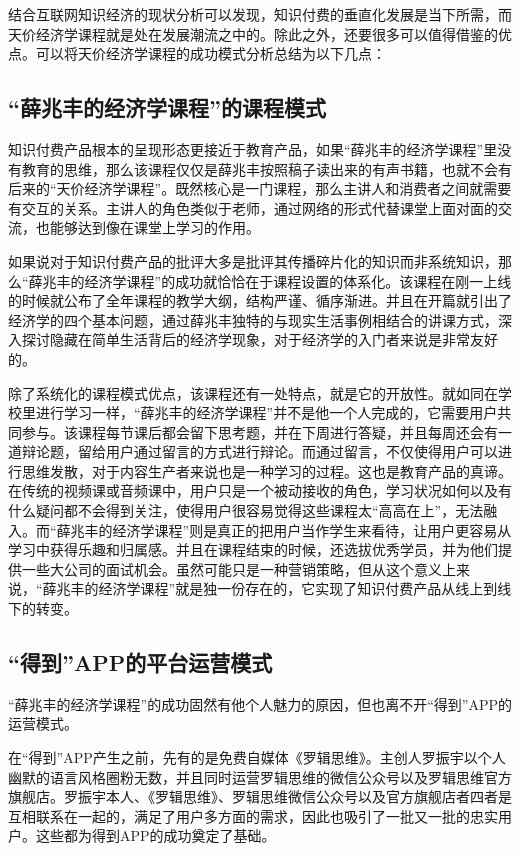 \documentclass[UTF8,a4paper,12pt]{ctexart}  %
\begin{document}
结合互联网知识经济的现状分析可以发现，知识付费的垂直化发展是当下所需，而天价经济学课程就是处在发展潮流之中的。除此之外，还要很多可以值得借鉴的优点。可以将天价经济学课程的成功模式分析总结为以下几点：

\hypertarget{section-15}{%
\subsection{``薛兆丰的经济学课程''的课程模式}\label{section-15}}

知识付费产品根本的呈现形态更接近于教育产品，如果``薛兆丰的经济学课程''里没有教育的思维，那么该课程仅仅是薛兆丰按照稿子读出来的有声书籍，也就不会有后来的``天价经济学课程''。既然核心是一门课程，那么主讲人和消费者之间就需要有交互的关系。主讲人的角色类似于老师，通过网络的形式代替课堂上面对面的交流，也能够达到像在课堂上学习的作用。

如果说对于知识付费产品的批评大多是批评其传播碎片化的知识而非系统知识，那么``薛兆丰的经济学课程''的成功就恰恰在于课程设置的体系化。该课程在刚一上线的时候就公布了全年课程的教学大纲，结构严谨、循序渐进。并且在开篇就引出了经济学的四个基本问题，通过薛兆丰独特的与现实生活事例相结合的讲课方式，深入探讨隐藏在简单生活背后的经济学现象，对于经济学的入门者来说是非常友好的。

除了系统化的课程模式优点，该课程还有一处特点，就是它的开放性。就如同在学校里进行学习一样，``薛兆丰的经济学课程''并不是他一个人完成的，它需要用户共同参与。该课程每节课后都会留下思考题，并在下周进行答疑，并且每周还会有一道辩论题，留给用户通过留言的方式进行辩论。而通过留言，不仅使得用户可以进行思维发散，对于内容生产者来说也是一种学习的过程。这也是教育产品的真谛。在传统的视频课或音频课中，用户只是一个被动接收的角色，学习状况如何以及有什么疑问都不会得到关注，使得用户很容易觉得这些课程太``高高在上''，无法融入。而``薛兆丰的经济学课程''则是真正的把用户当作学生来看待，让用户更容易从学习中获得乐趣和归属感。并且在课程结束的时候，还选拔优秀学员，并为他们提供一些大公司的面试机会。虽然可能只是一种营销策略，但从这个意义上来说，``薛兆丰的经济学课程''就是独一份存在的，它实现了知识付费产品从线上到线下的转变。

\hypertarget{app}{%
\subsection{``得到''APP的平台运营模式}\label{app}}

``薛兆丰的经济学课程''的成功固然有他个人魅力的原因，但也离不开``得到''APP的运营模式。

在``得到''APP产生之前，先有的是免费自媒体《罗辑思维》。主创人罗振宇以个人幽默的语言风格圈粉无数，并且同时运营罗辑思维的微信公众号以及罗辑思维官方旗舰店。罗振宇本人、《罗辑思维》、罗辑思维微信公众号以及官方旗舰店者四者是互相联系在一起的，满足了用户多方面的需求，因此也吸引了一批又一批的忠实用户。这些都为得到APP的成功奠定了基础。
\end{document}
